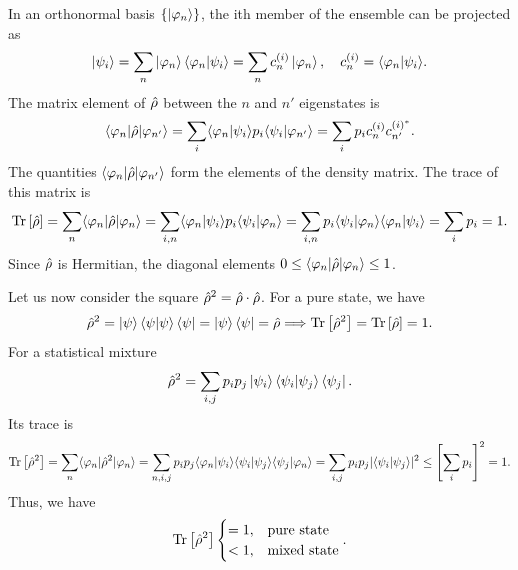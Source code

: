 In an orthonormal basis $\{\left|\varphi_n\right\rangle\}$, the ith member of the ensemble can be projected as 
\begin{align*}
    \left|\psi_i\right\rangle=\sum_n\left|\varphi_n\right\rangle\langle\varphi_n|\psi_i\rangle=\sum_nc_n^{(i)}\left|\varphi_n\right\rangle,\quad c_n^{(i)}=\langle\varphi_n|\psi_i\rangle.
\end{align*} 
The matrix element of $\hat{\rho}$ between the $n$ and $n'$ eigenstates is 
\begin{align*}
    \langle\varphi_n|\hat{\rho}|\varphi_{n'}\rangle=\sum_i\langle\varphi_n|\psi_i\rangle p_i\langle\psi_i|\varphi_{n'}\rangle=\sum_ip_ic_n^{(i)}c_{n'}^{(i)^*}.
\end{align*}
The quantities $\langle\varphi_n|\hat{\rho}|\varphi_{n'}\rangle$ form the elements of the density matrix. The trace of this matrix is 
\begin{align*}
    \text{Tr}\left[\hat{\rho}\right]=\sum_n\langle\varphi_n|\hat{\rho}|\varphi_n\rangle=\sum_{i,n}\langle\varphi_n|\psi_i\rangle p_i\langle\psi_i|\varphi_n\rangle=\sum_{i,n}p_i\langle\psi_i|\varphi_n\rangle\langle\varphi_n|\psi_i\rangle=\sum_ip_i=1.
\end{align*}
Since $\hat{\rho}$ is Hermitian, the diagonal elements $0\leq\langle\varphi_n|\hat{\rho}|\varphi_n\rangle\leq1$.

Let us now consider the square $\hat{\rho}^2=\hat{\rho}\cdot\hat{\rho}$. For a pure state, we have 
\begin{align*}
    \hat{\rho}^2=\left|\psi\right\rangle\langle\psi|\psi\rangle\left\langle\psi\right|=\left|\psi\right\rangle\left\langle\psi\right|=\hat{\rho}\Longrightarrow\text{Tr}\left[\hat{\rho}^2\right]=\text{Tr}\left[\hat{\rho}\right]=1.
\end{align*}
For a statistical mixture 
\begin{align*}
    \hat{\rho}^2=\sum_{i,j}p_ip_j\left|\psi_i\right\rangle\langle\psi_i|\psi_j\rangle\left\langle\psi_j\right|.
\end{align*}
Its trace is 
\begin{align*}
    \text{Tr}\left[\hat{\rho}^2\right]=\sum_n\langle\varphi_n|\hat{\rho}^2|\varphi_n\rangle=\sum_{n,i,j}p_ip_j\langle\varphi_n|\psi_i\rangle\langle\psi_i|\psi_j\rangle\langle\psi_j|\varphi_n\rangle=\sum_{i,j}p_ip_j
    |\langle\psi_i|\psi_j\rangle|^2\leq\left[\sum_ip_i\right]^2=1.
\end{align*}
Thus, we have 
\begin{align}
    \text{Tr}\left[\hat{\rho}^2\right]\begin{cases}
    =1,&\text{pure state}\\
    <1,&\text{mixed state}
    \end{cases}.
\end{align}

